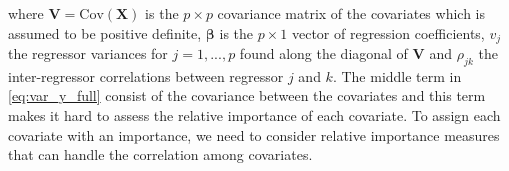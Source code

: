 \citep{gromping_relaimpo} where $\mathbf{V} = \text{Cov}(\mathbf{X})$ is the $p \times p$ covariance matrix of the covariates which is assumed to be positive definite, $\boldsymbol{\beta}$ is the $p \times 1$ vector of regression coefficients, $v_j$ the regressor variances for $j=1, ..., p$ found along the diagonal of $\mathbf{V}$ and $\rho_{jk}$ the inter-regressor correlations between regressor $j$ and $k$.
The middle term in \ref{eq:var_y_full} consist of the covariance between the covariates and this term makes it hard to assess the relative importance of each covariate. 
To assign each covariate with an importance, we need to consider relative importance measures that can handle the correlation among covariates.

